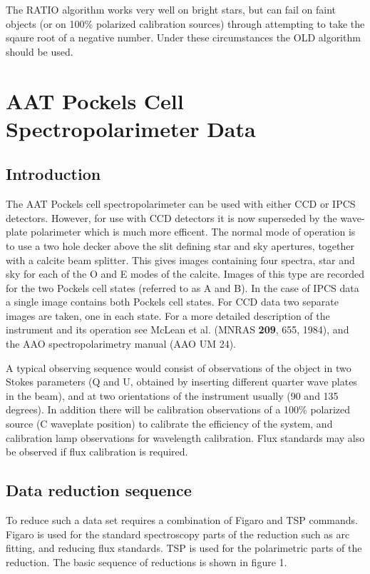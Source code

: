 \documentclass[11pt,twoside]{article}
\renewcommand{\_}{\texttt{\symbol{95}}}
\begin{document}
The RATIO algorithm works very well on bright stars, but can fail on faint objects
(or on 100\% polarized calibration sources) through attempting to take the
sqaure root of a negative number. Under these circumstances the OLD algorithm
should be used.

\section{AAT Pockels Cell Spectropolarimeter Data}

\subsection{Introduction}

The AAT Pockels cell spectropolarimeter can be used with either CCD or IPCS
detectors. However, for use with CCD detectors it is now superseded by the
wave-plate polarimeter which is much more efficent.
The normal mode of operation is to use a two hole decker above
the slit defining star and sky apertures, together with a calcite beam
splitter. This gives images containing four spectra, star and sky for each
of the O and E modes of the calcite. Images of this type are recorded for
the two Pockels cell states (referred to as A and B). In the case of IPCS data
a single image contains both Pockels cell states. For CCD data two separate
images are taken, one in each state. For a more detailed description of
the instrument and its operation see McLean et al. (MNRAS {\bf 209}, 655,
1984), and the AAO spectropolarimetry manual (AAO UM 24).

A typical observing sequence would consist of observations of the
object in two Stokes parameters (Q and U, obtained by inserting different
quarter wave plates in the beam), and at two orientations of the instrument
usually (90 and 135 degrees). In addition there will be calibration
observations of a 100\% polarized source (C waveplate position) to calibrate
the efficiency of the system, and calibration lamp observations for wavelength
calibration. Flux standards may also be observed if flux calibration is
required.

\subsection{Data reduction sequence}

To reduce such a data set requires a combination of Figaro and TSP commands.
Figaro is used for the standard spectroscopy parts of the reduction such as
arc fitting, and reducing flux standards. TSP is used for the polarimetric
parts of the reduction. The basic sequence of reductions is shown in figure 1.
\end{document}
